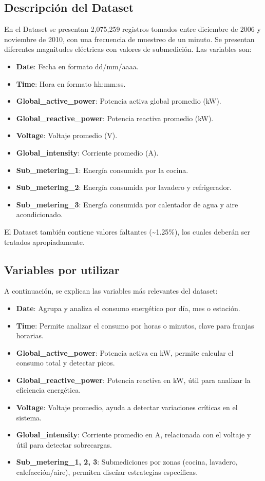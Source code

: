 \documentclass[12pt]{report}
\begin{document}
\subsection*{Descripción del Dataset}

En el Dataset se presentan 2,075,259 registros tomados entre diciembre de 2006 y noviembre de 2010, con una frecuencia de muestreo de un minuto. Se presentan diferentes magnitudes eléctricas con valores de submedición. Las variables son:

\begin{itemize}
    \item \textbf{Date}: Fecha en formato dd/mm/aaaa.
    \item \textbf{Time}: Hora en formato hh:mm:ss.
    \item \textbf{Global\_active\_power}: Potencia activa global promedio (kW).
    \item \textbf{Global\_reactive\_power}: Potencia reactiva promedio (kW).
    \item \textbf{Voltage}: Voltaje promedio (V).
    \item \textbf{Global\_intensity}: Corriente promedio (A).
    \item \textbf{Sub\_metering\_1}: Energía consumida por la cocina.
    \item \textbf{Sub\_metering\_2}: Energía consumida por lavadero y refrigerador.
    \item \textbf{Sub\_metering\_3}: Energía consumida por calentador de agua y aire acondicionado.
\end{itemize}

El Dataset también contiene valores faltantes (\textasciitilde 1.25\%), los cuales deberán ser tratados apropiadamente.

\subsection*{Variables por utilizar}

A continuación, se explican las variables más relevantes del dataset:

\begin{itemize}
    \item \textbf{Date}: Agrupa y analiza el consumo energético por día, mes o estación.
    \item \textbf{Time}: Permite analizar el consumo por horas o minutos, clave para franjas horarias.
    \item \textbf{Global\_active\_power}: Potencia activa en kW, permite calcular el consumo total y detectar picos.
    \item \textbf{Global\_reactive\_power}: Potencia reactiva en kW, útil para analizar la eficiencia energética.
    \item \textbf{Voltage}: Voltaje promedio, ayuda a detectar variaciones críticas en el sistema.
    \item \textbf{Global\_intensity}: Corriente promedio en A, relacionada con el voltaje y útil para detectar sobrecargas.
    \item \textbf{Sub\_metering\_1, 2, 3}: Submediciones por zonas (cocina, lavadero, calefacción/aire), permiten diseñar estrategias específicas.
\end{itemize}
\end{document}
